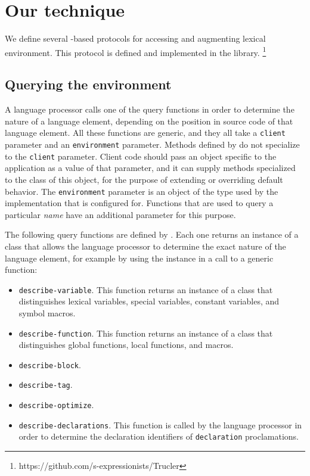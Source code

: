 \section{Our technique}

We define several \clos{}-based protocols for accessing and augmenting
lexical environment.  This protocol is defined and implemented in the
\trucler{} library.%
\footnote{https://github.com/s-expressionists/Trucler}

\subsection{Querying the environment}

A language processor calls one of the query functions in order to
determine the nature of a language element, depending on the position
in source code of that language element.  All these functions are
generic, and they all take a \texttt{client} parameter and an
\texttt{environment} parameter.  Methods defined by \trucler{} do not
specialize to the \texttt{client} parameter.  Client code should pass
an object specific to the application as a value of that parameter,
and it can supply methods specialized to the class of this object, for
the purpose of extending or overriding default behavior.  The
\texttt{environment} parameter is an object of the type used by the
implementation that \trucler{} is configured for.  Functions that are
used to query a particular \emph{name} have an additional parameter
for this purpose.

The following query functions are defined by \trucler{}.  Each one
returns an instance of a class that allows the language processor to
determine the exact nature of the language element, for example by
using the instance in a call to a generic function:

\begin{itemize}
\item \texttt{describe-variable}.  This function returns an instance
  of a class that distinguishes lexical variables, special variables,
  constant variables, and symbol macros.
\item \texttt{describe-function}.  This function returns an instance
  of a class that distinguishes global functions, local functions, and
  macros.
\item \texttt{describe-block}.
\item \texttt{describe-tag}.
\item \texttt{describe-optimize}.
\item \texttt{describe-declarations}.  This function is called by the
  language processor in order to determine the declaration identifiers
  of \texttt{declaration} proclamations.
\end{itemize}

